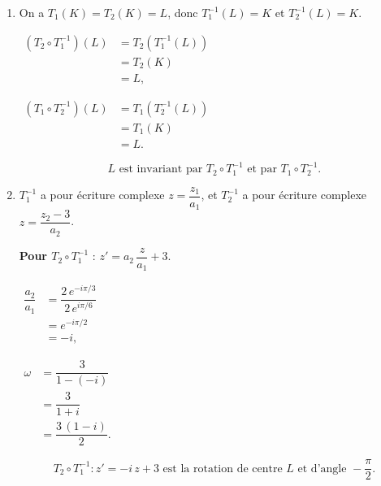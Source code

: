 \documentclass[12pt,a4paper]{article}
\begin{document}
\begin{enumerate}
    \[
    \boxed{z_K = \dfrac{3\left[(\sqrt3 - 1) - i(\sqrt3 + 1)\right]}{8} \qquad \text{et} \qquad z_L = \dfrac{3}{2} - \dfrac{3}{2}\,i.}
    \]

    \item On a $T_1(K) = T_2(K) = L$, donc $T_1^{-1}(L) = K$ et $T_2^{-1}(L) = K$.

    $
    \begin{aligned}
    \left(T_2\circ T_1^{-1}\right)(L) &= T_2\left(T_1^{-1}(L)\right) \\[1mm]
                                      &= T_2(K) \\[1mm]
                                      &= L,
    \end{aligned}
    $

    $
    \begin{aligned}
    \left(T_1\circ T_2^{-1}\right)(L) &= T_1\left(T_2^{-1}(L)\right) \\[1mm]
                                      &= T_1(K) \\[1mm]
                                      &= L.
    \end{aligned}
    $

    \[
    \boxed{L \text{ est invariant par } T_2\circ T_1^{-1} \text{ et par } T_1\circ T_2^{-1}.}
    \]

    \item $T_1^{-1}$ a pour écriture complexe $z = \dfrac{z_1}{a_1}$, et $T_2^{-1}$ a pour écriture complexe $z = \dfrac{z_2 - 3}{a_2}$.

    \textbf{Pour $T_2\circ T_1^{-1}$} : $z' = a_2\,\dfrac{z}{a_1} + 3$.

    $
    \begin{aligned}
    \dfrac{a_2}{a_1} &= \dfrac{2\,e^{-i\pi/3}}{2\,e^{i\pi/6}} \\[1mm]
                     &= e^{-i\pi/2} \\[1mm]
                     &= -i,
    \end{aligned}
    $

    $
    \begin{aligned}
    \omega &= \dfrac{3}{1 - (-i)} \\[1mm]
           &= \dfrac{3}{1 + i} \\[1mm]
           &= \dfrac{3\,(1 - i)}{2}.
    \end{aligned}
    $

    \[
    \boxed{T_2\circ T_1^{-1} : z' = -i\,z + 3 \text{ est la rotation de centre } L \text{ et d'angle } -\dfrac{\pi}{2}.}
    \]


\end{enumerate}
\end{document}
